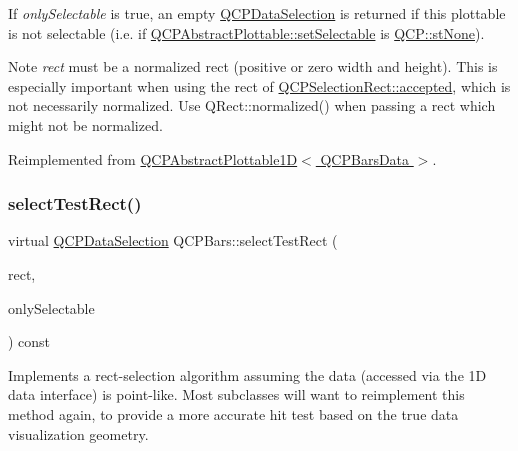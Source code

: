 If {\itshape only\+Selectable} is true, an empty \hyperlink{class_q_c_p_data_selection}{Q\+C\+P\+Data\+Selection} is returned if this plottable is not selectable (i.\+e. if \hyperlink{class_q_c_p_abstract_plottable_ac238d6e910f976f1f30d41c2bca44ac3}{Q\+C\+P\+Abstract\+Plottable\+::set\+Selectable} is \hyperlink{namespace_q_c_p_ac6cb9db26a564b27feda362a438db038a2cb7996ccc6c39b9e6d20f2e46bf3f57}{Q\+C\+P\+::st\+None}).

\begin{DoxyNote}{Note}
{\itshape rect} must be a normalized rect (positive or zero width and height). This is especially important when using the rect of \hyperlink{class_q_c_p_selection_rect_a15a43542e1f7b953a44c260b419e6d2c}{Q\+C\+P\+Selection\+Rect\+::accepted}, which is not necessarily normalized. Use {\ttfamily Q\+Rect\+::normalized()} when passing a rect which might not be normalized. 
\end{DoxyNote}


Reimplemented from \hyperlink{class_q_c_p_abstract_plottable1_d_ac385c38a79e419ed3600c2ee398fd216}{Q\+C\+P\+Abstract\+Plottable1\+D$<$ Q\+C\+P\+Bars\+Data $>$}.

\mbox{\label{class_q_c_p_bars_a429d8c3c39972bf6069329175bb85c34}} 
\subsubsection{\texorpdfstring{select\+Test\+Rect()}{selectTestRect()}\hspace{0.1cm}{\footnotesize\ttfamily [2/2]}}
{\footnotesize\ttfamily virtual \hyperlink{class_q_c_p_data_selection}{Q\+C\+P\+Data\+Selection} Q\+C\+P\+Bars\+::select\+Test\+Rect (\begin{DoxyParamCaption}\item[{const Q\+RectF \&}]{rect,  }\item[{bool}]{only\+Selectable }\end{DoxyParamCaption}) const\hspace{0.3cm}{\ttfamily [virtual]}}

Implements a rect-\/selection algorithm assuming the data (accessed via the 1D data interface) is point-\/like. Most subclasses will want to reimplement this method again, to provide a more accurate hit test based on the true data visualization geometry.

